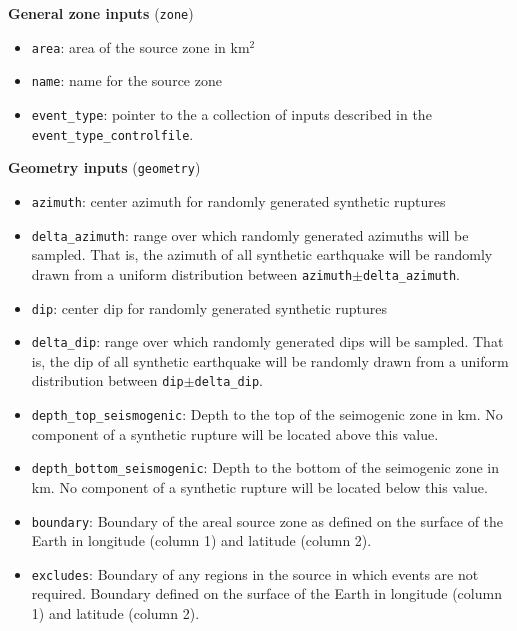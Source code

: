 \textbf{General zone inputs} (\texttt{zone})
\begin{itemize}
\item \texttt{area}: area of the source zone in km$^2$ \\
\item \texttt{name}: name for the source zone \\
\item \texttt{event\_type}: pointer to the a collection of inputs described in the
\texttt{event\_type\_controlfile}.
\end{itemize}

\textbf{Geometry inputs} (\texttt{geometry})
\begin{itemize}
\item \texttt{azimuth}: center azimuth for randomly generated synthetic ruptures \\
\item \texttt{delta\_azimuth}: range over which randomly generated azimuths will
be sampled. That is, the azimuth of all synthetic earthquake will be randomly drawn
from a uniform distribution between \texttt{azimuth}$\pm$\texttt{delta\_azimuth}. \\
\item \texttt{dip}: center dip for randomly generated synthetic ruptures \\
\item \texttt{delta\_dip}: range over which randomly generated dips will
be sampled. That is, the dip of all synthetic earthquake will be
randomly drawn from a uniform distribution between \texttt{dip}$\pm$\texttt{delta\_dip}.\\
\item \texttt{depth\_top\_seismogenic}: Depth to the top of the seimogenic zone in km.
No component of a synthetic rupture will be located above this value. \\
\item \texttt{depth\_bottom\_seismogenic}: Depth to the bottom of the seimogenic zone in km.
No component of a synthetic rupture will be located below this value. \\
\item \texttt{boundary}: Boundary of the areal source zone as
defined on the surface of the Earth in longitude (column 1) and
latitude (column 2). \\
\item \texttt{excludes}: Boundary of any regions in the source in
which events are not required. Boundary defined on the surface of
the Earth in longitude (column 1) and latitude (column 2).
\end{itemize}


